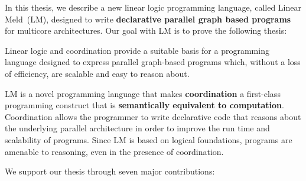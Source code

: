 
In this thesis, we describe a new linear logic programming language, called
Linear Meld~(LM), designed to write \textbf{declarative parallel graph based
programs} for multicore architectures. Our goal with LM is to prove the
following thesis:

\vspace{10px}
\begin{displayquote}
Linear logic and coordination provide a suitable basis for a programming language
designed to express parallel graph-based programs which, without a loss of
efficiency, are scalable and easy to reason about.
\end{displayquote}
\vspace{10px}

LM is a novel programming language that makes \textbf{coordination} a
first-class programming construct that is \textbf{semantically equivalent to
computation}. Coordination allows the programmer to write declarative code that
reasons about the underlying parallel architecture in order to improve the run
time and scalability of programs. Since LM is based on logical foundations,
programs are amenable to reasoning, even in the presence of coordination.

We support our thesis through seven major contributions:


